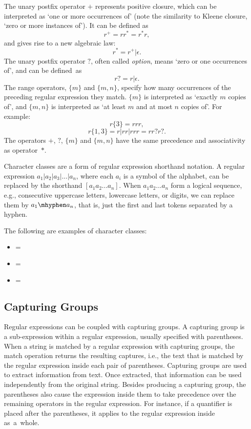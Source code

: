 The unary postfix operator \(+\) represents positive closure, which can be interpreted as `one or more occurrences of' (note the similarity to Kleene closure, `zero or more instances of'). It can be defined as
\[r^+ = rr^* = r^*r,\]
and gives rise to a new algebraic law:
\[r^* = r^+|\epsilon.\]
%
The unary postfix operator \(?\), often called \textit{option}, means `zero or one
occurrences of', and can be defined~as
\[ r? = r|\epsilon. \]
%
The range operators, \(\{m\}\) and \(\{m,n\}\), specify how many occurrences of the preceding regular expression they match. \(\{m\}\) is interpreted as `exactly \(m\) copies of', and \(\{m,n\}\) is interpreted as `at least \(m\) and at most \(n\) copies of'. For example:
\[r\{3\} = rrr,\]
\[r\{1,3\} = r|rr|rrr = rr?r?.\]
%
The operators \(+\), \(?\), \(\{m\}\) and \(\{m,n\}\) have the same precedence and associativity as operator~\(*\).


Character classes are a form of regular expression shorthand notation. A regular expression \(a_1|a_2|a_3|...|a_n\), where each \(a_i\) is a symbol of the alphabet, can be replaced by the shorthand \([a_1 a_2...a_n]\).
When \(a_1 a_2...a_n\) form a logical sequence, e.g., consecutive uppercase letters, lowercase letters, or digits, we
can replace them by \(a_1\mhyphen a_n\), that is, just the first and last tokens separated by
a hyphen.


\begin{example}
The following are examples of character classes:
\begin{itemize}
\item \regex{[abc]} = 
\item \regex{[a\mhyphen z]} = 
\item {} = 
\end{itemize}
\end{example}

\subsection{Capturing Groups}

Regular expressions can be coupled with capturing groups.
%
A capturing group is a sub-expression within a regular expression, usually specified with parentheses. %
When a string is matched by a regular expression with capturing groups, the match operation returns the resulting captures, i.e., the text that is matched by the regular expression inside each pair of parentheses. Capturing groups are used to extract information from text. Once extracted, that information can be used independently from the original string.
Besides producing a capturing group, the parentheses also cause the expression inside them to take precedence over the remaining operators in the regular expression.
For instance, if a quantifier is placed after the parentheses, it applies to the regular expression inside as~a~whole.

